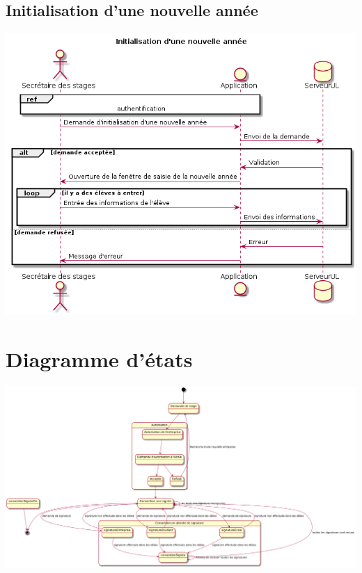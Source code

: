 \documentclass[11pt, a4paper]{report}
\begin{document}
\section*{Initialisation d'une nouvelle année}
\centerline{\includegraphics[scale=0.6]{Images/initialisationnouvelleannee.png}}


\chapter*{Diagramme d'états}
\centerline{\includegraphics[scale=0.35]{Images/diagrammedetats.png}}


\appendix
\end{document}
